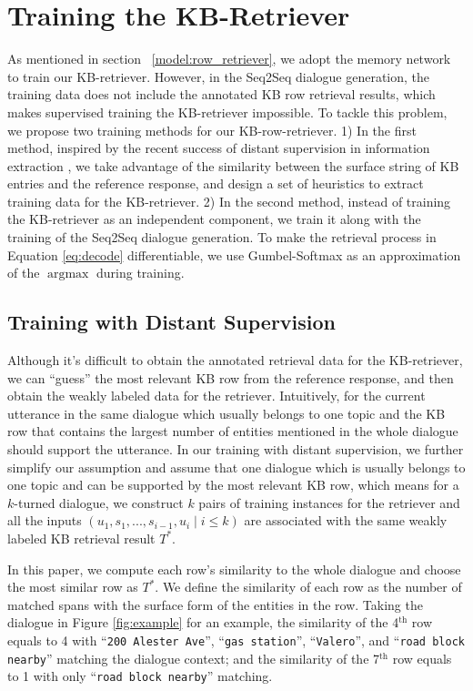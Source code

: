 \documentclass[11pt,a4paper]{article}
\DeclareMathOperator*{\argmax}{argmax}
\begin{document}
 \section{Training the KB-Retriever}
 As mentioned in section~ \ref{model:row_retriever}, we adopt the memory network to train our KB-retriever.
 However, in the Seq2Seq dialogue generation,
 the training data does not include the
 annotated KB row retrieval results, which makes
 supervised
 training the KB-retriever impossible.
 To tackle this problem,
 we propose two training methods for our KB-row-retriever.
 1) In the first method, inspired by the recent success of
 distant supervision in information extraction \cite{zeng2015distant,mintz2009distant,N13-1095,xu2013filling},
 we take advantage of the similarity between the surface string
 of KB entries and the reference response, and
 design a set of heuristics to extract training data for the KB-retriever.
 2) In the second method, instead of training the KB-retriever as
 an independent component, we train it along with the
 training of the Seq2Seq dialogue generation.
 To make the retrieval process in Equation \ref{eq:decode} differentiable,
 we use Gumbel-Softmax \cite{45822} as an approximation of the $\argmax$ during training.
 
 \subsection{Training with Distant Supervision}
 Although it's difficult to obtain
 the annotated retrieval data for the KB-retriever,
 we can ``guess'' the most relevant KB row from
 the reference response,
 and then obtain the weakly labeled data for the retriever.
Intuitively, for the current utterance in the same dialogue which usually belongs to one topic and the KB row that contains the largest number of
entities mentioned in the whole dialogue should support the utterance.
 In our training with distant supervision, 
 we further simplify our assumption and 
 assume that
 one dialogue which is usually belongs to one topic and can be supported by the most relevant KB row,
 which means for a $k$-turned dialogue, we construct
 $k$ pairs of training instances for the retriever and all
 the inputs $(u_{1}, s_{1}, ..., s_{i-1}, u_{i} \mid i \le k)$ are associated
 with the same weakly labeled KB retrieval result $T^*$.
 
 In this paper, we compute each row's similarity to the whole dialogue
 and choose the most similar row as $T^*$.
 We define the similarity of each row
 as the number of matched spans
 with the surface
 form of the entities in the row.
 Taking the dialogue in Figure \ref{fig:example} for an example,
 the similarity of the 4$^\text{th}$ row equals to 4 with ``\texttt{200 Alester Ave}'',
 ``\texttt{gas station}'', ``\texttt{Valero}'', and ``\texttt{road block nearby}''
 matching the dialogue context;
 and the similarity of the 7$^\text{th}$ row equals to 1 with only ``\texttt{road block nearby}''
 matching.
 
\end{document}

